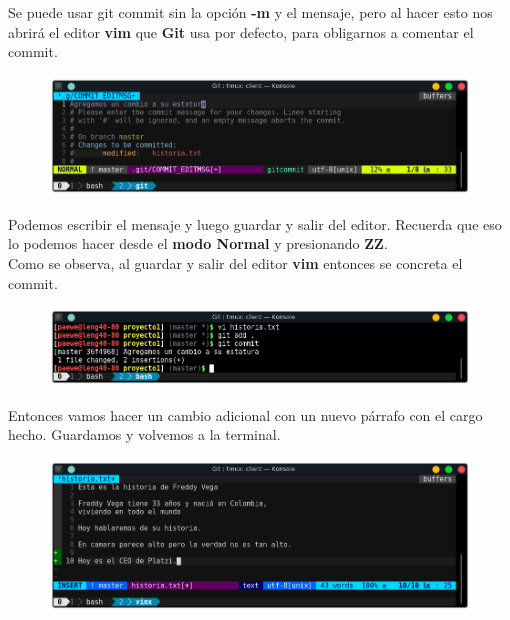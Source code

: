 \documentclass{article}
\begin{document}
Se puede usar git commit sin la opción \textbf{-m} y el mensaje, pero al hacer
esto nos abrirá el editor \textbf{vim} que \textbf{Git} usa por defecto, para
obligarnos a comentar el commit.

\begin{figure}[h!]
  \centering
  \includegraphics[scale=0.75]{./Pictures/088_vim_commit.png}
\end{figure}

Podemos escribir el mensaje y luego guardar y salir del editor. Recuerda que
eso lo podemos hacer desde el \textbf{modo Normal} y presionando \textbf{ZZ}.\\

Como se observa, al guardar y salir del editor \textbf{vim} entonces se
concreta el commit.

\begin{figure}[h!]
  \centering
  \includegraphics[scale=0.75]{./Pictures/089_commit_ok.png}
\end{figure}

Entonces vamos hacer un cambio adicional con un nuevo párrafo con el cargo
hecho. Guardamos y volvemos a la terminal.

\begin{figure}[h!]
  \centering
  \includegraphics[scale=0.75]{./Pictures/090_new_change.png}
\end{figure}
\end{document}
